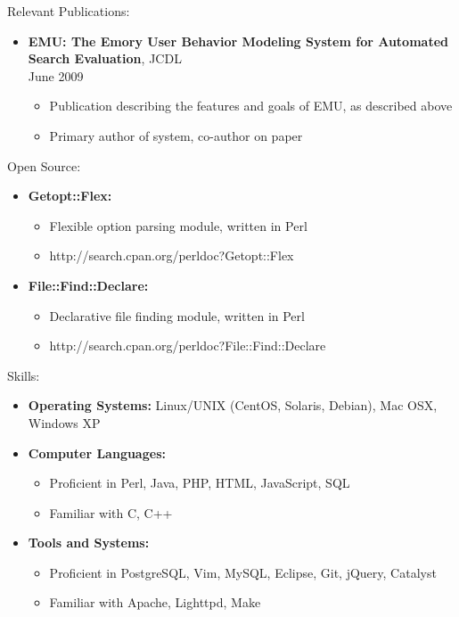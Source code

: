 \documentclass[10pt,oneside]{article}
\newenvironment{ressection}[1]{
	\vspace{4pt}
	{\fontfamily{phv}\selectfont\Large#1}
	\begin{itemize}
	\vspace{3pt}
}{
	\end{itemize}
}
\newcommand{\resitem}[1]{
	\vspace{-4pt}
	\item \begin{flushleft} #1 \end{flushleft}
}
\newcommand{\ressubitem}[1]{
	\vspace{-1pt}
	\item \begin{flushleft} #1 \end{flushleft}
}
\newcommand{\resbigitem}[3]{
	\vspace{-5pt}
	\item
	\textbf{#1}, #2 \\
	#3
}
\newenvironment{ressubsec}[3]{
	\resbigitem{#1}{#2}{#3}
	\vspace{-2pt}
	\begin{itemize}
}{
	\end{itemize}
}
\newenvironment{reslist}[1]{
	\resitem{\textbf{#1}}
	\vspace{-5pt}
	\begin{itemize}
}{
	\end{itemize}
}
\begin{document}
\begin{ressection}{Relevant Publications:}

	\begin{ressubsec}{EMU: The Emory User Behavior Modeling System for Automated Search Evaluation}{JCDL}{June 2009}
		\ressubitem{Publication describing the features and goals of EMU, as described above}
		\ressubitem{Primary author of system, co-author on paper}
	\end{ressubsec}
	
\end{ressection}

\begin{ressection}{Open Source:}

	\begin{reslist}{Getopt::Flex:}
		\ressubitem{Flexible option parsing module, written in Perl}
		\ressubitem{http://search.cpan.org/perldoc?Getopt::Flex}
	\end{reslist}

	\begin{reslist}{File::Find::Declare:}
		\ressubitem{Declarative file finding module, written in Perl}
		\ressubitem{http://search.cpan.org/perldoc?File::Find::Declare}
	\end{reslist}

\end{ressection}

\begin{ressection}{Skills:}

    \resitem{\textbf{Operating Systems:} Linux/UNIX (CentOS, Solaris, Debian), Mac OSX, Windows XP}

	\begin{reslist}{Computer Languages:}
		\ressubitem{Proficient in Perl, Java, PHP, HTML, JavaScript, SQL}
		\ressubitem{Familiar with C, C++}
	\end{reslist}

	\begin{reslist}{Tools and Systems:}
		\ressubitem{Proficient in PostgreSQL, Vim, MySQL, Eclipse, Git, jQuery, Catalyst}
		\ressubitem{Familiar with Apache, Lighttpd, Make}
	\end{reslist}

\end{ressection}
\end{document}
